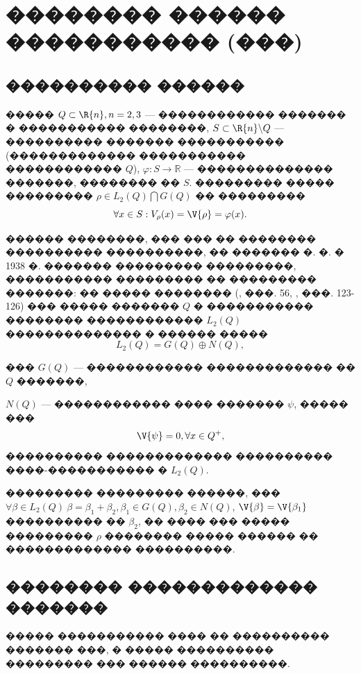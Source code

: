 \documentclass[a4paper]{article}
\begin{document}
\FloatBarrier
\clearpage %
\section{�������� ������ ����������� (���)}
\subsection{���������� ������}
����� $Q\subset \R{n}, n=2,3$ --- ������������ ������� � ����������� ��������,
$S \subset \R{n}\backslash Q$ --- ���������� ������� ����������� (������������� ����������� ������������ $Q$), $\varphi: S \rightarrow \mathbb{R}$ --- �������������� �������, �������� �� $S$.
��������� ����� ��������� $\rho \in L_2(Q) \bigcap G(Q)$ �� ���������
\begin{equation}
  \forall x \in S: V_\rho(x)= \V{\rho}= \varphi(x).
\end{equation}

������ ��������, ��� ��� �� �������� ���������� ����������, �� ������� �. �. � 1938 �. ������� ��������� ���������, ����������� ��������� �� ��������� �������:
�� ����� �������� (\cite{lezh}, ���. 56, \cite{nov}, ���. 123-126) ��� ����� ������� $Q$ � ����������� �������� ������������ $L_2(Q)$ �������������� � ������ �����
\begin{equation}
  L_2(Q)= G(Q) \oplus N(Q),
\end{equation}

��� $G(Q)$ --- ������������ ������������� �� $Q$ �������,

$N(Q)$ --- ������������ ���� ������� $\psi$, ����� ���
\begin{equation}
  \V{\psi}=0, \forall x\in Q^+,
\end{equation}
���������� ������������� ���������� ����-����������� � $L_2(Q)$.

��������� ��������� ������, ��� $\forall \beta \in L_2(Q) \ \beta = \beta_1 + \beta_2, \beta_1 \in G(Q), \beta_2 \in N(Q)$, $\V{\beta}=\V{\beta_1}$ ���������� �� $\beta_2$, �� ���� ��� ����� ��������� $\rho$ �������� ����� ������ �� ������������� ����������.


\subsection{�������� ������������� �������}

����� ����������� ���� �� ���������� ������� ���, � ����� ���������� ��������� ��� ������ ����������.
\end{document}
